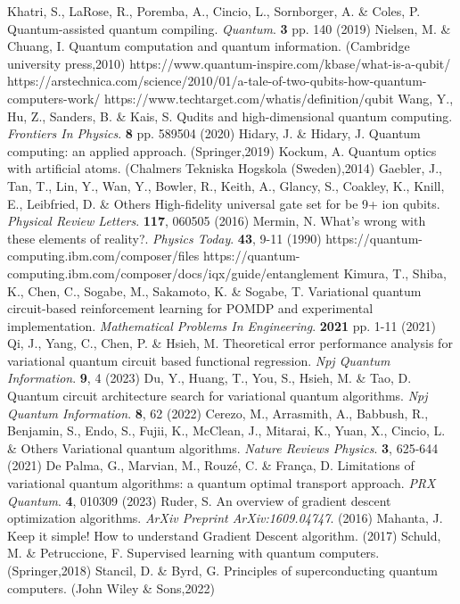 \documentclass[inscr,ack,preface]{diphdthesis}
\begin{document}
\begin{thebibliography}{99}                                     \footnotesize{}{
Khatri, S., LaRose, R., Poremba, A., Cincio, L., Sornborger, A. \& Coles, P. Quantum-assisted quantum compiling. {\em Quantum}. \textbf{3} pp. 140 (2019)
Nielsen, M. \& Chuang, I. Quantum computation and quantum information. (Cambridge university press,2010)
https://www.quantum-inspire.com/kbase/what-is-a-qubit/
https://arstechnica.com/science/2010/01/a-tale-of-two-qubits-how-quantum-computers-work/
https://www.techtarget.com/whatis/definition/qubit
Wang, Y., Hu, Z., Sanders, B. \& Kais, S. Qudits and high-dimensional quantum computing. {\em Frontiers In Physics}. \textbf{8} pp. 589504 (2020)
Hidary, J. \& Hidary, J. Quantum computing: an applied approach. (Springer,2019)
Kockum, A. Quantum optics with artificial atoms. (Chalmers Tekniska Hogskola (Sweden),2014)
Gaebler, J., Tan, T., Lin, Y., Wan, Y., Bowler, R., Keith, A., Glancy, S., Coakley, K., Knill, E., Leibfried, D. \& Others High-fidelity universal gate set for be 9+ ion qubits. {\em Physical Review Letters}. \textbf{117}, 060505 (2016)
Mermin, N. What's wrong with these elements of reality?. {\em Physics Today}. \textbf{43}, 9-11 (1990)
https://quantum-computing.ibm.com/composer/files
https://quantum-computing.ibm.com/composer/docs/iqx/guide/entanglement
Kimura, T., Shiba, K., Chen, C., Sogabe, M., Sakamoto, K. \& Sogabe, T. Variational quantum circuit-based reinforcement learning for POMDP and experimental implementation. {\em Mathematical Problems In Engineering}. \textbf{2021} pp. 1-11 (2021)
Qi, J., Yang, C., Chen, P. \& Hsieh, M. Theoretical error performance analysis for variational quantum circuit based functional regression. {\em Npj Quantum Information}. \textbf{9}, 4 (2023)
Du, Y., Huang, T., You, S., Hsieh, M. \& Tao, D. Quantum circuit architecture search for variational quantum algorithms. {\em Npj Quantum Information}. \textbf{8}, 62 (2022)
Cerezo, M., Arrasmith, A., Babbush, R., Benjamin, S., Endo, S., Fujii, K., McClean, J., Mitarai, K., Yuan, X., Cincio, L. \& Others Variational quantum algorithms. {\em Nature Reviews Physics}. \textbf{3}, 625-644 (2021)
De Palma, G., Marvian, M., Rouzé, C. \& França, D. Limitations of variational quantum algorithms: a quantum optimal transport approach. {\em PRX Quantum}. \textbf{4}, 010309 (2023)
Ruder, S. An overview of gradient descent optimization algorithms. {\em ArXiv Preprint ArXiv:1609.04747}. (2016)
Mahanta, J. Keep it simple! How to understand Gradient Descent algorithm.  (2017)
Schuld, M. \& Petruccione, F. Supervised learning with quantum computers. (Springer,2018)
Stancil, D. \& Byrd, G. Principles of superconducting quantum computers. (John Wiley & Sons,2022)
}


\end{thebibliography}
\end{document}
